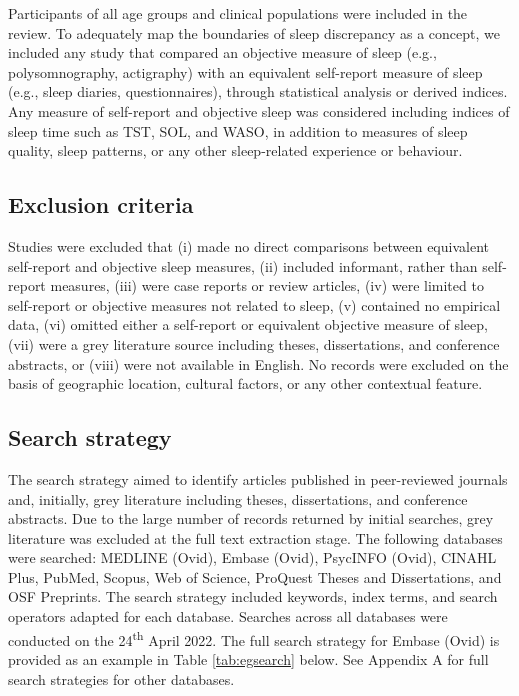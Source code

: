 \documentclass[
]{article}
\begin{document}
Participants of all age groups and clinical populations were included in the review. To adequately map the boundaries of sleep discrepancy as a concept, we included any study that compared an objective measure of sleep (e.g., polysomnography, actigraphy) with an equivalent self-report measure of sleep (e.g., sleep diaries, questionnaires), through statistical analysis or derived indices. Any measure of self-report and objective sleep was considered including indices of sleep time such as TST, SOL, and WASO, in addition to measures of sleep quality, sleep patterns, or any other sleep-related experience or behaviour.

\subsection{Exclusion criteria}\label{exclusion-criteria}

Studies were excluded that (i) made no direct comparisons between equivalent self-report and objective sleep measures, (ii) included informant, rather than self-report measures, (iii) were case reports or review articles, (iv) were limited to self-report or objective measures not related to sleep, (v) contained no empirical data, (vi) omitted either a self-report or equivalent objective measure of sleep, (vii) were a grey literature source including theses, dissertations, and conference abstracts, or (viii) were not available in English. No records were excluded on the basis of geographic location, cultural factors, or any other contextual feature.

\subsection{Search strategy}\label{item7}

The search strategy aimed to identify articles published in peer-reviewed journals and, initially, grey literature including theses, dissertations, and conference abstracts. Due to the large number of records returned by initial searches, grey literature was excluded at the full text extraction stage. The following databases were searched: MEDLINE (Ovid), Embase (Ovid), PsycINFO (Ovid), CINAHL Plus, PubMed, Scopus, Web of Science, ProQuest Theses and Dissertations, and OSF Preprints. The search strategy included keywords, index terms, and search operators adapted for each database. Searches across all databases were conducted on the 24\textsuperscript{th} April 2022. The full search strategy for Embase (Ovid) is provided as an example in Table \ref{tab:egsearch} below. See Appendix A for full search strategies for other databases.
\end{document}
